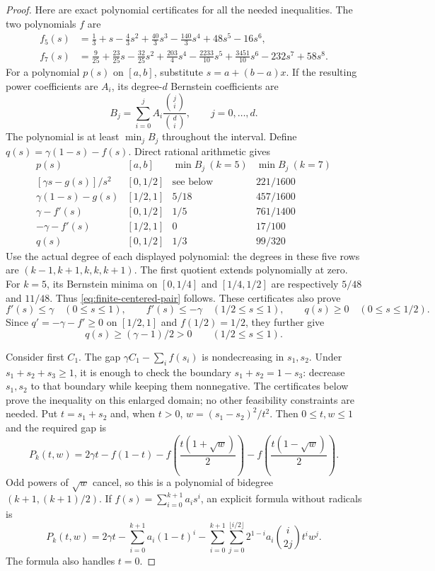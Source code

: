 \documentclass[11pt]{article}
\begin{document}
\begin{proof}
Here are exact polynomial certificates for all the needed inequalities.
The two polynomials $f$ are
\begin{align*}
 f_5(s)&=\frac13+s-\frac43s^2+\frac{40}{3}s^3
             -\frac{140}{3}s^4+48s^5-16s^6,\\
 f_7(s)&=\frac9{25}+\frac{23}{25}s-\frac{32}{25}s^2
             +\frac{203}{4}s^4-\frac{2233}{10}s^5
             +\frac{3451}{10}s^6-232s^7+58s^8.
\end{align*}
For a polynomial $p(s)$ on $[a,b]$, substitute $s=a+(b-a)x$.
If the resulting power coefficients are $A_i$, its degree-$d$
Bernstein coefficients are
\[
 B_j=\sum_{i=0}^j A_i\frac{\binom ji}{\binom di},
 \qquad j=0,\ldots,d.
\]
The polynomial is at least $\min_j B_j$ throughout the interval.
Define $q(s)=\gamma(1-s)-f(s)$. Direct rational arithmetic gives
\[
\begin{array}{c|c|c|c}
 p(s)&[a,b]&\min B_j\ (k=5)&\min B_j\ (k=7)\\\hline
 {}[\gamma s-g(s)]/s^2 &[0,1/2]&\text{see below}&221/1600\\
 \gamma(1-s)-g(s)&[1/2,1]&5/18&457/1600\\
 \gamma-f'(s)&[0,1/2]&1/5&761/1400\\
 -\gamma-f'(s)&[1/2,1]&0&17/100\\
 q(s)&[0,1/2]&1/3&99/320
\end{array}
\]
Use the actual degree of each displayed polynomial: the degrees in
these five rows are $(k-1,k+1,k,k,k+1)$. The first quotient extends
polynomially at zero. For $k=5$, its Bernstein minima on $[0,1/4]$
and $[1/4,1/2]$ are respectively $5/48$ and $11/48$.
Thus \eqref{eq:finite-centered-pair} follows. These certificates also prove
\[
 f'(s)\le\gamma\quad(0\le s\le1),\qquad
 f'(s)\le-\gamma\quad(1/2\le s\le1),\qquad
 q(s)\ge0\quad(0\le s\le1/2).
\]
Since $q'=-\gamma-f'\ge0$ on $[1/2,1]$ and
$f(1/2)=1/2$, they further give
\begin{equation}
 q(s)\ge(\gamma-1)/2>0\qquad(1/2\le s\le1).
 \label{eq:centered-q}
\end{equation}

Consider first $C_1$. The gap $\gamma C_1-\sum_i f(s_i)$ is
nondecreasing in $s_1,s_2$. Under $s_1+s_2+s_3\ge1$, it is enough
to check the boundary $s_1+s_2=1-s_3$: decrease $s_1,s_2$ to that
boundary while keeping them nonnegative. The certificates below prove
the inequality on this enlarged domain; no other feasibility
constraints are needed. Put $t=s_1+s_2$ and, when $t>0$,
$w=(s_1-s_2)^2/t^2$. Then $0\le t,w\le1$ and the required gap is
\[
 P_k(t,w)=2\gamma t-f(1-t)
     -f\left(\frac{t(1+\sqrt w)}2\right)
     -f\left(\frac{t(1-\sqrt w)}2\right).
\]
Odd powers of $\sqrt w$ cancel, so this is a polynomial of bidegree
$(k+1,(k+1)/2)$. If $f(s)=\sum_{i=0}^{k+1}a_i s^i$, an explicit
formula without radicals is
\begin{equation}
 P_k(t,w)=2\gamma t-\sum_{i=0}^{k+1}a_i(1-t)^i
 -\sum_{i=0}^{k+1}\sum_{j=0}^{\lfloor i/2\rfloor}
      2^{1-i}a_i\binom i{2j}t^i w^j.
 \label{eq:centered-P}
\end{equation}
The formula also handles $t=0$.


\end{proof}
\end{document}
